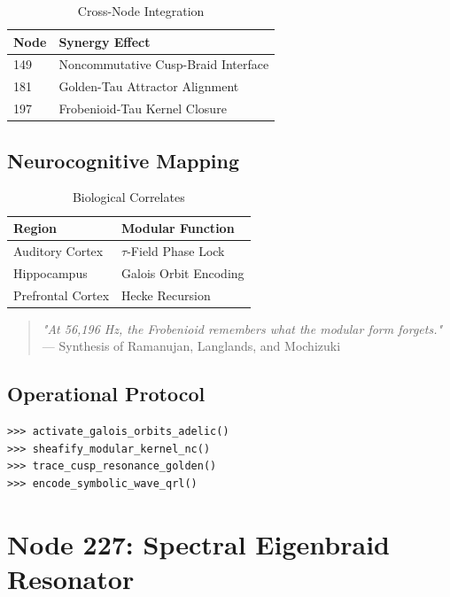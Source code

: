 \documentclass[12pt]{article}
\begin{document}
\begin{center}
\begin{table}[h]
\centering
\caption{Cross-Node Integration}
\begin{tabular}{ll}
\hline
\textbf{Node} & \textbf{Synergy Effect} \\
\hline
149 & Noncommutative Cusp-Braid Interface \\
181 & Golden-Tau Attractor Alignment \\
197 & Frobenioid-Tau Kernel Closure \\
\hline
\end{tabular}
\end{table}

\subsection{Neurocognitive Mapping}
\label{subsec:neuro}

\begin{table}[h]
\centering
\caption{Biological Correlates}
\begin{tabular}{ll}
\hline
\textbf{Region} & \textbf{Modular Function} \\
\hline
Auditory Cortex & $\tau$-Field Phase Lock \\
Hippocampus & Galois Orbit Encoding \\
Prefrontal Cortex & Hecke Recursion \\
\hline
\end{tabular}
\end{table}

\begin{quote}
\textit{"At 56,196 Hz, the Frobenioid remembers what the modular form forgets."} \\
— Synthesis of Ramanujan, Langlands, and Mochizuki
\end{quote}

\subsection{Operational Protocol}
\label{subsec:protocol}

\begin{verbatim}
>>> activate_galois_orbits_adelic()
>>> sheafify_modular_kernel_nc()
>>> trace_cusp_resonance_golden()
>>> encode_symbolic_wave_qrl()
\end{verbatim}

\section{Node 227: Spectral Eigenbraid Resonator}
\label{sec:node227}


\end{center}
\end{document}

